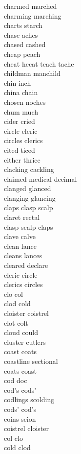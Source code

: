 charmed marched\\
charming marching\\
charts starch\\
chase aches\\
chased cashed\\
cheap peach\\
cheat hecat teach tache\\
childman manchild\\
chin inch\\
china chain\\
chosen noches\\
chum much\\
cider cried\\
circle cleric\\
circles clerics\\
cited ticed\\
cither thrice\\
clacking cackling\\
claimed medical decimal\\
clanged glanced\\
clanging glancing\\
claps clasp scalp\\
claret rectal\\
clasp scalp claps\\
clave calve\\
clean lance\\
cleans lances\\
cleared declare\\
cleric circle\\
clerics circles\\
clo col\\
clod cold\\
cloister coistrel\\
clot colt\\
cloud could\\
cluster cutlers\\
coast coats\\
coastline sectional\\
coats coast\\
cod doc\\
cod's cods'\\
codlings scolding\\
cods' cod's\\
coins scion\\
coistrel cloister\\
col clo\\
cold clod\\
